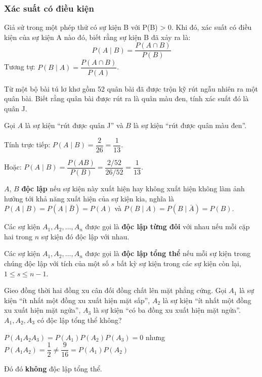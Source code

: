 \documentclass[12pt,a4paper]{article}
\begin{document}
\subsubsection{Xác suất có điều kiện}

\begin{dinhnghia}
Giả sử trong một phép thử có sự kiện B với P(B) > 0. Khi đó, xác suất có điều kiện của sự kiện A nào đó,
biết rằng sự kiện B đã xảy ra là:
\[
  \displaystyle P(A \mid B) = \dfrac{P(A \cap B)}{P(B)}
\]
Tương tự: $P(B \mid A) = \dfrac{P(A \cap B)}{P(A)}$.
\end{dinhnghia}

\begin{vidu}[title={Rút bài -- biết quân đen}]
Từ một bộ bài tú lơ khơ gồm 52 quân bài đã được trộn kỹ rút ngẫu nhiên ra một quân bài. Biết rằng quân bài được rút ra là quân màu đen, tính xác suất đó là quân J.

Gọi $A$ là sự kiện “rút được quân J” và $B$ là sự kiện “rút được quân màu đen”.

Tính trực tiếp: $P(A \mid B) = \dfrac{2}{26} = \dfrac{1}{13}$.

Hoặc: $P(A \mid B) = \dfrac{P(AB)}{P(B)} = \dfrac{2/52}{26/52} = \dfrac{1}{13}$.
\end{vidu}

\begin{dinhnghia}[title={Độc lập}]
$A$, $B$ \textbf{độc lập} nếu sự kiện này xuất hiện hay không xuất hiện không làm ảnh hưởng tới khả năng xuất hiện của sự kiện kia, nghĩa là $P(A \mid B) = P(A \mid \bar{B}) = P(A)$ và $P(B \mid A) = P(B \mid \bar{A}) = P(B)$.

Các sự kiện $A_1, A_2, \ldots, A_n$ được gọi là \textbf{độc lập từng đôi} với nhau nếu mỗi cặp hai trong $n$ sự kiện đó độc lập với nhau.

Các sự kiện $A_1, A_2, \ldots, A_n$ được gọi là \textbf{độc lập tổng thể} nếu mỗi sự kiện trong chúng độc lập với tích của một số $s$ bất kỳ sự kiện trong các sự kiện còn lại, $1 \le s \le n - 1$.
\end{dinhnghia}

\begin{phanvidu}[title={Không độc lập tổng thể}]
Gieo đồng thời hai đồng xu cân đối đồng chất lên mặt phẳng cứng. Gọi $A_1$ là sự kiện “ít nhất một đồng xu
xuất hiện mặt sấp”, $A_2$ là sự kiện “ít nhất một đồng xu xuất hiện mặt ngửa”, $A_3$ là sự kiện “có ba đồng xu
xuất hiện mặt ngửa”. $A_1, A_2, A_3$ có độc lập tổng thể không?

$P(A_1 A_2 A_3) = P(A_1)P(A_2)P(A_3) = 0$ nhưng $P(A_1 A_2) = \dfrac{1}{2} \ne \dfrac{9}{16} = P(A_1)P(A_2)$

Đó đó \textbf{không} độc lập tổng thể.
\end{phanvidu}
\end{document}
